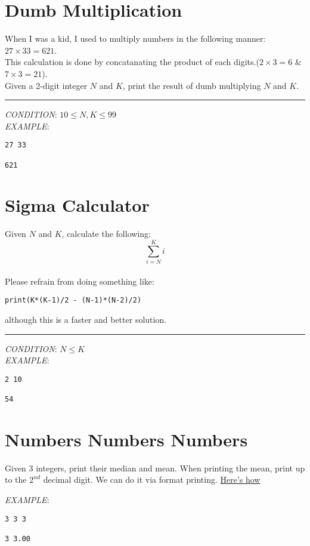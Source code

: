 \documentclass{article}
\begin{document}
\thispagestyle{fancy}
\setcounter{section}{-1}

\section{Dumb Multiplication}
When I was a kid, I used to multiply numbers in the following manner:
$27 \times 33 = 621$.\\
This calculation is done by concatanating the product of
each digits.($2\times3=6$ \& $7\times3=21$).\\
Given a 2-digit integer $N$ and $K$, print the result of dumb multiplying $N$ and $K$.\\
\noindent\rule{\textwidth}{0.9pt}
\textit{CONDITION}: $ 10 \le N, K \le 99 $\\
\textit{EXAMPLE}:\\
\begin{lstlisting}
27 33

621
\end{lstlisting}

\section{Sigma Calculator}
Given $N$ and $K$, calculate the following:
$$\sum_{i=N}^{K} i$$\\
Please refrain from doing something like:
\begin{lstlisting}
print(K*(K-1)/2 - (N-1)*(N-2)/2) 
\end{lstlisting}
although this is a faster and better solution.\\
\noindent\rule{\textwidth}{0.9pt}
\textit{CONDITION}: $N \le K$\\
\textit{EXAMPLE}:\\
\begin{lstlisting}
2 10

54
\end{lstlisting}

\section{Numbers Numbers Numbers}
Given 3 integers, print their median and mean. When printing the mean, print up
to the $2^{nd}$ decimal digit. We can do it via format printing.
\href{https://www.google.com/search?q=python+format+float+length}{Here's how}

\textit{EXAMPLE}:\\
\begin{lstlisting}
3 3 3

3 3.00
\end{lstlisting}
\end{document}
